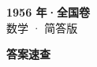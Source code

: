 \documentclass[zihao=-4, a4paper]{ctexart}
\begin{document}
\begin{center}
  {\Large\bfseries 1956 年·全国卷}\\[4pt]
  {\large 数学 · 简答版}
\end{center}
\medskip
{}

\clearpage
{}
\begin{center}{\Large\bfseries 答案速查}\end{center}
\medskip

\end{document}
